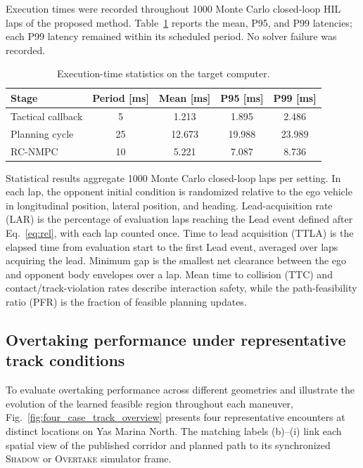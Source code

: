 \documentclass[sensors,article,submit,moreauthors]{Definitions/mdpi}
\begin{document}
Execution times were recorded throughout 1000 Monte Carlo closed-loop HIL laps of the proposed method. Table~\ref{tab:runtime} reports the mean, P95, and P99 latencies; each P99 latency remained within its scheduled period. No solver failure was recorded.

\begin{table}[!htbp]
\centering
\footnotesize
\setlength{\tabcolsep}{2.0pt}
\renewcommand{\arraystretch}{1.05}
\caption{Execution-time statistics on the target computer.}
\label{tab:runtime}
\begin{tabular}{@{}lcccc@{}}
\toprule
Stage & Period [ms] & Mean [ms] & P95 [ms] & P99 [ms] \\
\midrule
Tactical callback & 5 & 1.213 & 1.895 & 2.486 \\
Planning cycle & 25 & 12.673 & 19.988 & 23.989 \\
RC-NMPC & 10 & 5.221 & 7.087 & 8.736 \\
\bottomrule
\end{tabular}
\end{table}

Statistical results aggregate 1000 Monte Carlo closed-loop laps per setting.
In each lap, the opponent initial condition is randomized relative to
the ego vehicle in longitudinal position, lateral position, and heading. 
Lead-acquisition rate (LAR) is the percentage of evaluation laps reaching the
Lead event defined after Eq.~\eqref{eq:rel}, with each lap counted once.
Time to lead acquisition (TTLA) is the elapsed time from evaluation start to
the first Lead event, averaged over laps acquiring the lead. Minimum
gap is the smallest net clearance between the ego and opponent body envelopes
over a lap. Mean time to collision (TTC) and contact/track-violation rates
describe interaction safety, while the path-feasibility ratio (PFR) is the
fraction of feasible planning updates.



\subsection{Overtaking performance under representative track conditions}
\label{subsec:representative_cases}

To evaluate overtaking performance across different geometries and illustrate
the evolution of the learned feasible region throughout each maneuver,
Fig.~\ref{fig:four_case_track_overview} presents four representative
encounters at distinct locations on Yas Marina North. The matching labels
(b)--(i) link each spatial view of the published corridor and planned path to
its synchronized \textsc{Shadow} or \textsc{Overtake} simulator frame. 
\end{document}
